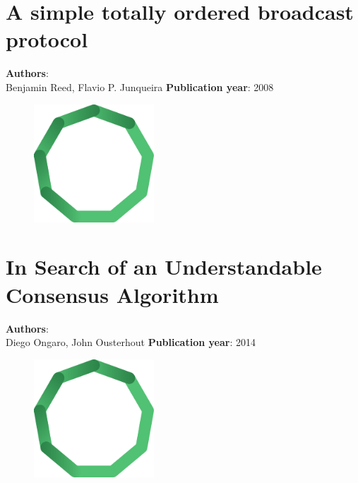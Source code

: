\documentclass[11pt,fleqn]{book} %
\begin{document}
\chapter{A simple totally ordered broadcast protocol}
\vspace*{-7mm}
\Large \textbf{Authors}: \\
Benjamin Reed, Flavio P. Junqueira
\newline\newline
\textbf{Publication year}: 2008
\begin{figure}[b]
    \centering
    \includegraphics[width=0.4\textwidth]{distributed-systems.pdf}
\end{figure}


\chapter{In Search of an Understandable Consensus Algorithm}
\vspace*{-7mm}
\Large \textbf{Authors}: \\
Diego Ongaro, John Ousterhout
\newline\newline
\textbf{Publication year}: 2014
\begin{figure}[b]
    \centering
    \includegraphics[width=0.4\textwidth]{distributed-systems.pdf}
\end{figure}

\end{document}
